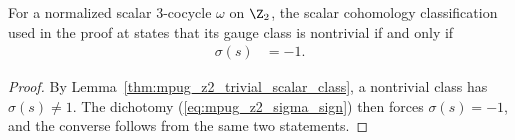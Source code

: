 \begin{lemma}
    \label{thm:mpug_z2_nontrivial_scalar_class}
    \leanok
    For a normalized scalar $3$-cocycle $\omega$ on $\Z_2$, the scalar
    cohomology classification used in the proof at
    \cite[lines~5339--5341]{FrancoRubio2025MPUGauging} states that its gauge
    class is nontrivial if and only if
    \begin{align}
        \sigma(s) & =-1.
        \label{eq:mpug_z2_nontrivial_sigma}
    \end{align}
\end{lemma}
\begin{proof}\leanok
    By Lemma~\ref{thm:mpug_z2_trivial_scalar_class}, a nontrivial class has
    $\sigma(s)\neq1$. The dichotomy
    (\ref{eq:mpug_z2_sigma_sign}) then forces $\sigma(s)=-1$, and the converse
    follows from the same two statements.
\end{proof}
